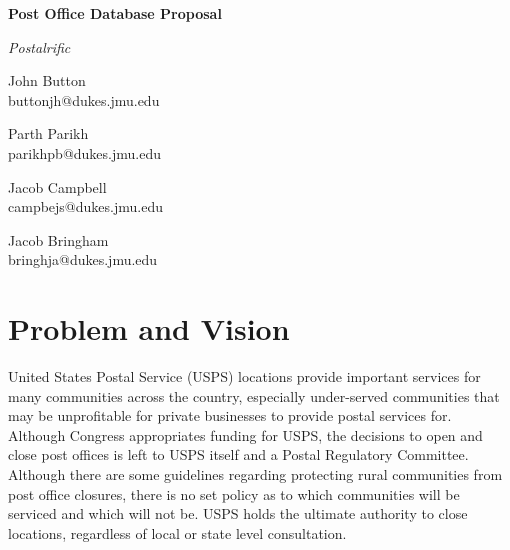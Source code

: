 \documentclass[11pt]{article}
\begin{document}

\begin{center}
\bfseries\huge
Post Office Database Proposal
\end{center}

\begin{center}
\itshape\large
Postalrific
\end{center}

\begin{multicols}{4}
\centering

John Button \\
{\footnotesize buttonjh@dukes.jmu.edu}

Parth Parikh \\
{\footnotesize parikhpb@dukes.jmu.edu}

Jacob Campbell \\
{\footnotesize campbejs@dukes.jmu.edu}

Jacob Bringham \\
{\footnotesize bringhja@dukes.jmu.edu}

\end{multicols}

\section*{Problem and Vision}


United States Postal Service (USPS) locations provide important services for many communities across the country, especially under-served communities that may be unprofitable for private businesses to provide postal services for. Although Congress appropriates funding for USPS, the decisions to open and close post offices is left to USPS itself and a Postal Regulatory Committee. Although there are some guidelines regarding protecting rural communities from post office closures, there is no set policy as to which communities will be serviced and which will not be. USPS holds the ultimate authority to close locations, regardless of local or state level consultation. 
\end{document}
